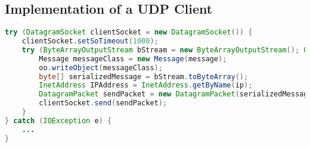 \subsection{Implementation of a UDP Client}
\begin{minipage}{\linewidth}
	\begin{lstlisting}[language=Java, caption={Implementation of the UDP send message method},captionpos=b,label=lst:sendUDPMessage]
try (DatagramSocket clientSocket = new DatagramSocket()) {
	clientSocket.setSoTimeout(1000);
	try (ByteArrayOutputStream bStream = new ByteArrayOutputStream(); ObjectOutput oo = new ObjectOutputStream(bStream)) {
		Message messageClass = new Message(message);
		oo.writeObject(messageClass);
		byte[] serializedMessage = bStream.toByteArray();
		InetAddress IPAddress = InetAddress.getByName(ip);
		DatagramPacket sendPacket = new DatagramPacket(serializedMessage, serializedMessage.length, IPAddress, port);
		clientSocket.send(sendPacket);
	}
} catch (IOException e) {
	...
}
	\end{lstlisting}
\end{minipage}